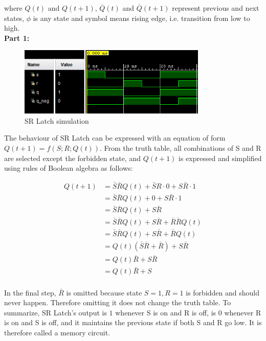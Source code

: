 \documentclass{article}
\begin{document}
	where $Q(t)$ and $Q(t+1)$, $\overline{Q}(t)$ and $\overline{Q}(t+1)$ represent previous and next states, $\phi$ is any state and  symbol means rising edge, i.e. transition from low to high. \\
	
	\textbf{Part 1:}
	\begin{figure}[h]
		\centering
		\includegraphics[width=0.8\textwidth]{part1.png}
		\caption{SR Latch simulation}
		\centering
	\end{figure}	
	
	The behaviour of SR Latch can be expressed with an equation of form $Q(t + 1) = f(S; R; Q(t)).$ From the truth table, all combinations of S and R are selected except the forbidden state, and $Q(t + 1)$ is expressed and simplified using rules of Boolean algebra as follows:

	\begin{align*}			 
	 Q(t + 1) &= \bar{S} \bar{R} Q(t) + \bar{S} R \cdot 0 + S \bar {R} \cdot 1 \tag{Truth table} \\
	 &= \bar{S} \bar{R} Q(t) + 0 + S  \bar{R} \cdot 1 \tag{Dominance} \\
	 &= \bar{S} \bar{R} Q(t) + S  \bar{R} \tag{Identity} \\
	 &= \bar{S} \bar{R} Q(t) + S \bar{R} + \bar{R} \bar{R} Q(t) \tag{Consensus theorem} \\
	 &= \bar{S} \bar{R} Q(t) + S \bar{R} + \bar{R} Q(t) \tag{Idempotency} \\
	 &=  Q(t)(\bar{S} \bar{R} + \bar{R}) + S \bar{R}  \tag{Distributivity} \\
	 &=  Q(t)\bar{R} + S \bar{R}  \tag{Absorption} \\
	 &=  Q(t)\bar{R} + S\\
	\end{align*}

	In the final step, $\bar{R}$ is omitted because state $S = 1, R = 1$ is forbidden and should never happen. Therefore omitting it does not change the truth table. To summarize, SR Latch's output is $1$ whenever S is on and R is off, is $0$ whenever R is on and S is off, and it maintains the previous state if both S and R go low. It is therefore called a memory circuit. \\
	
\end{document}
